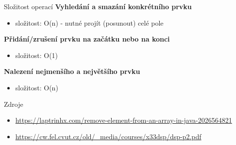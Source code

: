 \documentclass[11pt,xcolor=pdflatex,hyperref={unicode}]{beamer}
\begin{document}
\begin{frame}{Složitost operací}
    \textbf{Vyhledání a smazání konkrétního prvku} 
    \begin{itemize}
        \item složitost: O(n) - nutné projít (posunout) celé pole
    \end{itemize}
    \textbf{Přidání/zrušení prvku na začátku nebo na konci} 
    \begin{itemize}
        \item složitost: O(1)
    \end{itemize}
    \textbf{Nalezení nejmenšího a největšího prvku} 
    \begin{itemize}
        \item složitost: O(n)
    \end{itemize}
\end{frame}

\begin{frame}{Zdroje}
    \begin{itemize}
        \item \url{https://laptrinhx.com/remove-element-from-an-array-in-java-2026564821}
        \item \url{https://cw.fel.cvut.cz/old/\_media/courses/x33dsp/dsp-p2.pdf}
    \end{itemize}
\end{frame}
\end{document}
